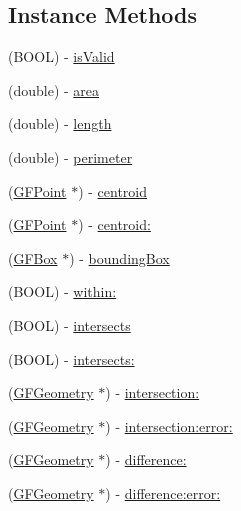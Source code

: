 \subsection*{Instance Methods}
\begin{DoxyCompactItemize}
\item 
(B\+O\+O\+L) -\/ \hyperlink{interface_g_f_geometry_a3a63de5905eae52356c6afd7313e4828}{is\+Valid}
\item 
(double) -\/ \hyperlink{interface_g_f_geometry_a0028dc3b2c2315a24d803dfa4cf2250e}{area}
\item 
(double) -\/ \hyperlink{interface_g_f_geometry_ab68dd3c418a3f06c6593d02dfebe2585}{length}
\item 
(double) -\/ \hyperlink{interface_g_f_geometry_a31593eea12da7a9ed46b2dd4e6ca511e}{perimeter}
\item 
(\hyperlink{interface_g_f_point}{G\+F\+Point} $\ast$) -\/ \hyperlink{interface_g_f_geometry_af53b7bf19dfea6827eed19a7979c7dca}{centroid}
\item 
(\hyperlink{interface_g_f_point}{G\+F\+Point} $\ast$) -\/ \hyperlink{interface_g_f_geometry_a16f03e92b3636e574d5f8659e822de69}{centroid\+:}
\item 
(\hyperlink{interface_g_f_box}{G\+F\+Box} $\ast$) -\/ \hyperlink{interface_g_f_geometry_a808ba7daf6d4c3d742668ad3fe5d0f0e}{bounding\+Box}
\item 
(B\+O\+O\+L) -\/ \hyperlink{interface_g_f_geometry_a832350c76f4a42a39889c9138108edd2}{within\+:}
\item 
(B\+O\+O\+L) -\/ \hyperlink{interface_g_f_geometry_a3735ea20bc337cff79944bbe08f3bdf0}{intersects}
\item 
(B\+O\+O\+L) -\/ \hyperlink{interface_g_f_geometry_a86d1a80435c6b838dfb8b1a22a17a0b8}{intersects\+:}
\item 
(\hyperlink{interface_g_f_geometry}{G\+F\+Geometry} $\ast$) -\/ \hyperlink{interface_g_f_geometry_ac93053aeabad1f97466b1ec31292ed11}{intersection\+:}
\item 
(\hyperlink{interface_g_f_geometry}{G\+F\+Geometry} $\ast$) -\/ \hyperlink{interface_g_f_geometry_a6faa39e502da86516c58b5ce65847924}{intersection\+:error\+:}
\item 
(\hyperlink{interface_g_f_geometry}{G\+F\+Geometry} $\ast$) -\/ \hyperlink{interface_g_f_geometry_acb76057cb6cdee9255ecba8447045cc6}{difference\+:}
\item 
(\hyperlink{interface_g_f_geometry}{G\+F\+Geometry} $\ast$) -\/ \hyperlink{interface_g_f_geometry_a30eb0242f8e9f9e3e1d542af03e4144b}{difference\+:error\+:}

\end{DoxyCompactItemize}
